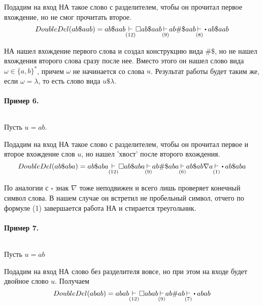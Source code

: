 Подадим на вход НА такое слово с разделителем, чтобы он прочитал первое вхождение, но не смог
прочитать второе.
 \[
     DoubleDel(ab\$aab) = ab\$aab \underset{(12)}{\step} \square ab\$ aab
     \underset{(9)}{\step} ab\#\$aab \underset{(8)}{\step}\bigcdot ab\$aab
\] 

НА нашел вхождение первого слова и создал конструкцию вида $\#\$$, но не нашел
вхождения второго слова сразу после нее. Вместо этого он нашел слово вида
 $\omega \in \{a,b\}^{*}$, причем $\omega$ не начинается со слова $u$.
 Результат работы будет таким же,
 если $\omega = \lambda$, то есть слово вида  $u\$\lambda$.

\paragraph*{Пример 6.} ${}$ \newline

Пусть $u = ab$.

Подадим на вход НА такое слово с разделителем, чтобы он прочитал первое и второе вхождение
слов $u$, но нашел 'хвост' после второго вхождения.
 \[
     DoubleDel(ab\$aba) = ab\$aba \underset{(12)}{\step} \square ab\$ aba
     \underset{(9)}{\step} ab\#\$aba \underset{(6)}{\step} ab\$ab\nabla a
     \underset{(1)}{\step}\bigcdot ab\$aba
\] 

По аналогии с $\square$ знак  $\nabla $ тоже неподвижен и всего лишь проверяет
конечный символ слова. В нашем случае он встретил не пробельный символ, отчего
по формуле (1) завершается работа НА и стирается треугольник.

\paragraph*{Пример 7.} ${}$ \newline

Пусть $u = ab$ 

Подадим на вход НА слово без разделителя вовсе, но при этом на входе будет
двойное слово $u$. Получаем
 \[
     DoubleDel(abab) = abab \underset{(12)}{\step} \square abab
     \underset{(9)}{\step} ab\#ab \underset{(7)}{\step}\bigcdot abab
\] 


